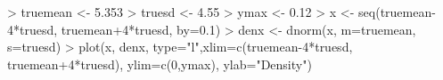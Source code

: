 \begin{Schunk}
\begin{Sinput}
> truemean <- 5.353
> truesd <- 4.55
> ymax <- 0.12
> x <- seq(truemean-4*truesd, truemean+4*truesd, by=0.1)
> denx <- dnorm(x, m=truemean, s=truesd)
> plot(x, denx, type="l",xlim=c(truemean-4*truesd, truemean+4*truesd), ylim=c(0,ymax), ylab="Density")
\end{Sinput}
\end{Schunk}
